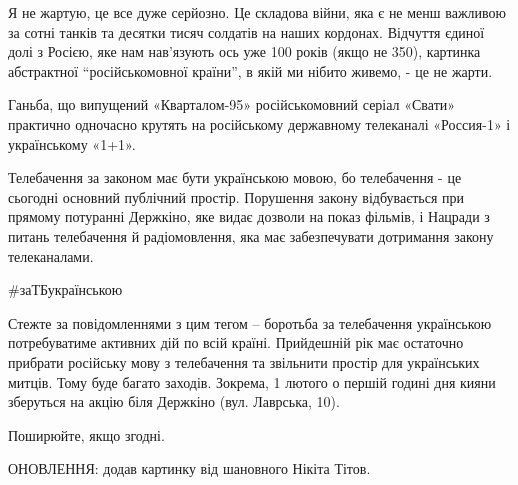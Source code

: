 Я не жартую, це все дуже серйозно. Це складова війни, яка є не менш важливою за
сотні танків та десятки тисяч солдатів на наших кордонах. Відчуття єдиної долі
з Росією, яке нам нав'язують ось уже 100 років (якщо не 350), картинка
абстрактної \enquote{російськомовної країни}, в якій ми нібито живемо, - це не жарти.

Ганьба, що випущений «Кварталом-95» російськомовний серіал «Свати» практично
одночасно крутять на російському державному телеканалі «Россия-1» і
українському «1+1».

Телебачення за законом має бути українською мовою, бо телебачення - це
сьогодні основний публічний простір. Порушення закону відбувається при прямому
потуранні  Держкіно, яке видає дозволи на показ фільмів, і Нацради з питань
телебачення й радіомовлення, яка має забезпечувати дотримання закону
телеканалами.

\#заТБукраїнською

Стежте за повідомленнями з цим тегом – боротьба за телебачення українською
потребуватиме активних дій по всій країні. Прийдешній рік має остаточно
прибрати російську мову з телебачення та звільнити простір для українських
митців. Тому буде багато заходів. Зокрема, 1 лютого о першій годині дня кияни
зберуться на акцію біля Держкіно (вул. Лаврська, 10). 

Поширюйте, якщо згодні.

ОНОВЛЕННЯ: додав картинку від шановного Нікіта Тітов.

